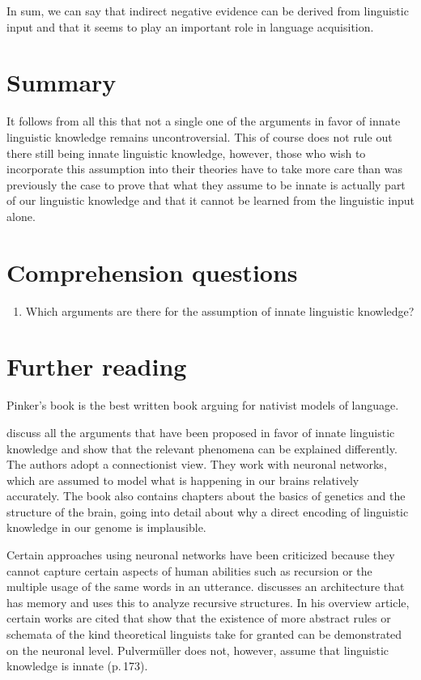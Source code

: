 In sum, we can say that indirect negative evidence can be derived from linguistic input and that it
seems to play an important role in language acquisition.
% 

\section{Summary}

It follows from all this that not a single one of the arguments in favor of innate linguistic knowledge remains uncontroversial.
This of course does not rule out there still being innate linguistic knowledge, however, those who wish to incorporate
this assumption into their theories have to take more care than was previously the case to prove that what they assume to be innate
is actually part of our linguistic knowledge and that it cannot be learned from the linguistic input alone.%
%


\section*{Comprehension questions}

\begin{enumerate}
\item Which arguments are there for the assumption of innate linguistic knowledge?
\end{enumerate} 


\section*{Further reading}

Pinker's book \citeyearpar{Pinker94a} is the best written book arguing for nativist models of language.

\citet*{EBJKSPP96a} discuss all the arguments that have been proposed in favor of innate linguistic knowledge and show
that the relevant phenomena can be explained differently. The authors adopt a connectionist view. They work with neuronal
networks, which are assumed to model what is happening in our brains relatively accurately.
The book also contains chapters about the basics of genetics and the structure of the brain, going into detail about why
a direct encoding of linguistic knowledge in our genome is implausible. 

Certain approaches using neuronal networks have been criticized because they cannot capture certain aspects of human abilities
such as recursion or the multiple usage of the same words in an utterance.
 \citet{Pulvermueller2010a} discusses an architecture that has memory and uses this to analyze recursive structures. In his overview article,
 certain works are cited that show that the existence of more abstract rules or schemata of the kind theoretical linguists take for granted
 can be demonstrated on the neuronal level. Pulvermüller does not, however, assume that linguistic knowledge is innate (p.\,173).

